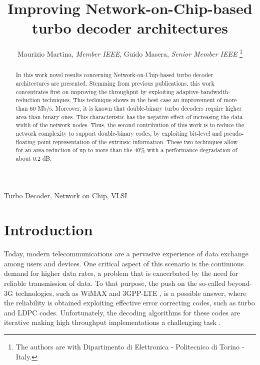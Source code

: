 \documentclass[10pt,twocolumn,journal]{IEEEtran}
\title{Improving Network-on-Chip-based turbo decoder architectures}
\author{Maurizio Martina, \emph{Member IEEE}, Guido Masera, \emph{Senior Member IEEE} 
\thanks{The authors are with 
Dipartimento di Elettronica - Politecnico di Torino - Italy. 
}}
\begin{document}
\maketitle

\begin{abstract}
In this work novel results concerning Network-on-Chip-based turbo decoder architectures are presented.
Stemming from previous publications, this work concentrates first on improving the throughput by exploiting 
adaptive-bandwidth-reduction techniques. 
This technique shows in the best case an improvement of more than 60 Mb/s. 
Moreover, it is known that double-binary turbo decoders require higher 
area than binary ones. This characteristic has the negative effect of increasing the data width of the network nodes. 
Thus, the second contribution of this work is to reduce the network complexity to support double-binary codes, 
by exploiting bit-level and pseudo-floating-point representation of the extrinsic information. 
These two techniques allow for an area reduction of up to more than the 40\% with a performance degradation of 
about 0.2 dB.
\end{abstract}

\begin{IEEEkeywords}
Turbo Decoder, Network on Chip, VLSI
\end{IEEEkeywords}

\section{Introduction}
\label{sec:intro}

Today, modern telecommunications are a pervasive experience of data exchange among users and devices. 
One critical aspect of this scenario is the continuous demand for higher data rates, a problem that is exacerbated 
by the need for reliable transmission of data.
To that purpose, the push on the so-called beyond-3G technologies, such as WiMAX \cite{802-16} and 3GPP-LTE \cite{lte}, 
is a possible answer, where the reliability is obtained exploiting effective error correcting codes, 
such as turbo \cite{berrou_ICC93} and LDPC \cite{gallager_TrIT62} codes. 
Unfortunately, the decoding algorithms for these codes are iterative making high throughput implementations 
a challenging task \cite{montorsi_IEEEProc07, boutillon_TCOM07}. 
\end{document}

